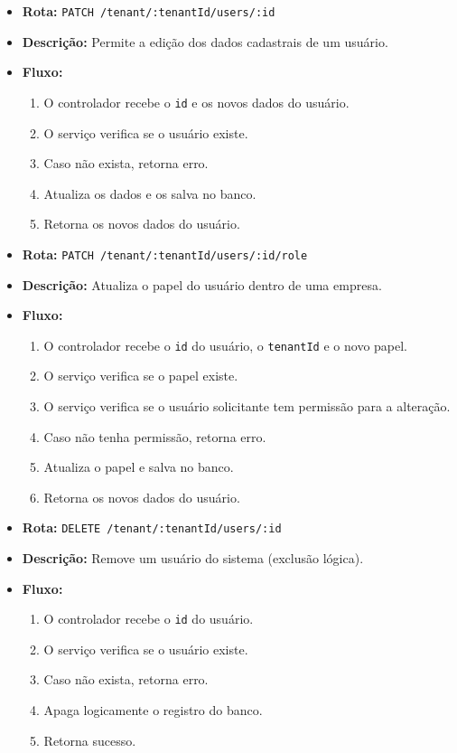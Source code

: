\begin{itemize}
  \item \textbf{Rota:} \texttt{PATCH /tenant/:tenantId/users/:id}
  \item \textbf{Descrição:} Permite a edição dos dados cadastrais de um usuário.
  \item \textbf{Fluxo:}
  \begin{enumerate}
    \item O controlador recebe o \texttt{id} e os novos dados do usuário.
    \item O serviço verifica se o usuário existe.
    \item Caso não exista, retorna erro.
    \item Atualiza os dados e os salva no banco.
    \item Retorna os novos dados do usuário.
  \end{enumerate}
\end{itemize}

\begin{itemize}
  \item \textbf{Rota:} \texttt{PATCH /tenant/:tenantId/users/:id/role}
  \item \textbf{Descrição:} Atualiza o papel do usuário dentro de uma empresa.
  \item \textbf{Fluxo:}
  \begin{enumerate}
    \item O controlador recebe o \texttt{id} do usuário, o \texttt{tenantId} e o novo papel.
    \item O serviço verifica se o papel existe.
    \item O serviço verifica se o usuário solicitante tem permissão para a alteração.
    \item Caso não tenha permissão, retorna erro.
    \item Atualiza o papel e salva no banco.
    \item Retorna os novos dados do usuário.
  \end{enumerate}
\end{itemize}

\begin{itemize}
  \item \textbf{Rota:} \texttt{DELETE /tenant/:tenantId/users/:id}
  \item \textbf{Descrição:} Remove um usuário do sistema (exclusão lógica).
  \item \textbf{Fluxo:}
  \begin{enumerate}
    \item O controlador recebe o \texttt{id} do usuário.
    \item O serviço verifica se o usuário existe.
    \item Caso não exista, retorna erro.
    \item Apaga logicamente o registro do banco.
    \item Retorna sucesso.
  \end{enumerate}
\end{itemize}

